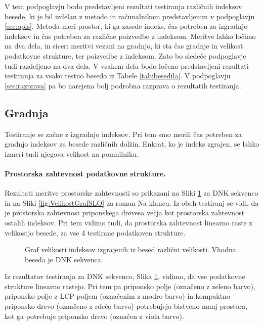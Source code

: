 V tem podpoglavju bodo predstavljeni rezultati testiranja različnih indeksov besede, ki je bil izdelan z metodo in računalnikom predstavljenim v podpoglavju \ref{sec:opis}. Metoda meri prostor, ki ga zasede indeks, čas potreben za izgradnjo indeksov in čas potreben za različne poizvedbe z indeksom. Meritve lahko ločimo na dva dela, in sicer: meritvi vezani na gradnjo, ki sta čas gradnje in velikost podatkovne strukture, ter poizvedbe z indeksom. Zato bo sledeče podpoglavje tudi razdeljeno na dva dela. V vsakem delu bodo ločeno predstavljeni rezultati testiranja za vsako testno besedo iz Tabele \ref{tab:besedila}. V podpoglavju \ref{sec:razprava} pa bo narejena bolj podrobna razprava o rezultatih testiranja.

\subsection{Gradnja}
Testiranje se začne z izgradnjo indeksov. Pri tem smo merili čas potreben za gradnjo indeksov za besede različnih dolžin. Enkrat, ko je indeks zgrajen, se lahko izmeri tudi njegova velikost na pomnilniku.

\paragraph{Prostorska zahtevnost podatkovne strukture.}

Rezultati meritve prostorske zahtevnosti so prikazani na Sliki \ref{fig:VelikostGraf} za DNK sekvenco in na Sliki \ref{fig:VelikostGrafSLO} za roman Na klancu. Iz obeh testiranj se vidi, da je prostorska zahtevnost priponskega drevesa večja kot prostorska zahtevnost ostalih indeksov. Pri tem vidimo tudi, da prostorska zahtevnost linearno raste z velikostjo besede, za vse 4 testirane podatkoven strukture.

\begin{figure}[htb]
    \centering
    
    \caption{Graf velikosti indeksov izgrajenih iz besed različni velikosti. Vhodna beseda je DNK sekvenca.} 
    \label{fig:VelikostGraf}
\end{figure}

Iz rezultatov testiranja za DNK sekvenco, Slika \ref{fig:VelikostGraf}, vidimo, da vse podatkovne strukture linearno rastejo. Pri tem pa priponsko polje (označeno z zeleno barvo), priponsko polje z LCP poljem (označenim z modro barvo) in kompaktno priponsko drevo (označeno z rdečo barvo) potrebujejo bistveno manj prostora, kot ga potrebuje priponsko drevo (označen z viola barvo).

